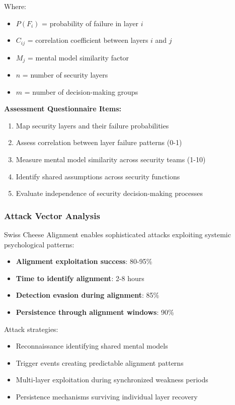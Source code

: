 \documentclass[11pt,a4paper]{article}
\begin{document}
Where:
\begin{itemize}
\item $P(F_i)$ = probability of failure in layer $i$
\item $C_{ij}$ = correlation coefficient between layers $i$ and $j$
\item $M_j$ = mental model similarity factor
\item $n$ = number of security layers
\item $m$ = number of decision-making groups
\end{itemize}

\textbf{Assessment Questionnaire Items:}
\begin{enumerate}
\item Map security layers and their failure probabilities
\item Assess correlation between layer failure patterns (0-1)
\item Measure mental model similarity across security teams (1-10)
\item Identify shared assumptions across security functions
\item Evaluate independence of security decision-making processes
\end{enumerate}

\subsubsection{Attack Vector Analysis}

Swiss Cheese Alignment enables sophisticated attacks exploiting systemic psychological patterns:

\begin{itemize}
\item \textbf{Alignment exploitation success}: 80-95\%
\item \textbf{Time to identify alignment}: 2-8 hours
\item \textbf{Detection evasion during alignment}: 85\%
\item \textbf{Persistence through alignment windows}: 90\%
\end{itemize}

Attack strategies:
\begin{itemize}
\item Reconnaissance identifying shared mental models
\item Trigger events creating predictable alignment patterns
\item Multi-layer exploitation during synchronized weakness periods
\item Persistence mechanisms surviving individual layer recovery
\end{itemize}
\end{document}
